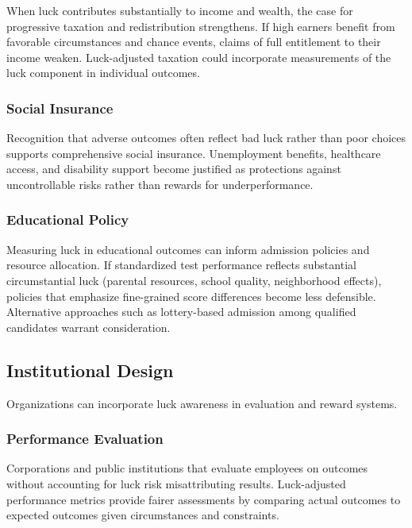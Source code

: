 When luck contributes substantially to income and wealth, the case for progressive
taxation and redistribution strengthens. If high earners benefit from
favorable circumstances and chance events, claims of full entitlement to
their income weaken. Luck-adjusted taxation could incorporate
measurements of the luck component in individual outcomes.

\subsubsection{Social Insurance}

Recognition that adverse outcomes often reflect bad luck rather than poor
choices supports comprehensive social insurance. Unemployment benefits, healthcare
access, and disability support become justified as protections against
uncontrollable risks rather than rewards for underperformance.

\subsubsection{Educational Policy}

Measuring luck in educational outcomes can inform admission policies and
resource allocation. If standardized test performance reflects
substantial circumstantial luck (parental resources, school quality, neighborhood
effects), policies that emphasize fine-grained score differences become less
defensible. Alternative approaches such as lottery-based admission among
qualified candidates warrant consideration.

\subsection{Institutional Design}

Organizations can incorporate luck awareness in evaluation and reward systems.

\subsubsection{Performance Evaluation}

Corporations and public institutions that evaluate employees on outcomes
without accounting for luck risk misattributing results. Luck-adjusted performance
metrics provide fairer assessments by comparing actual outcomes to expected
outcomes given circumstances and constraints.

